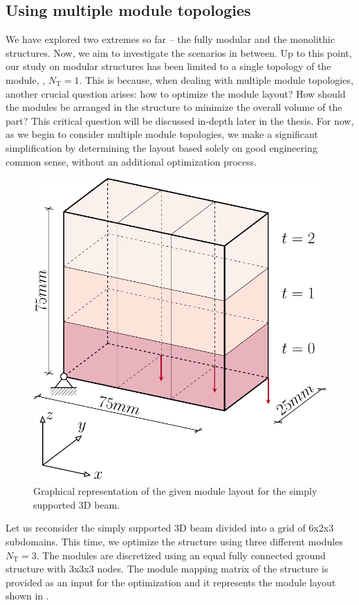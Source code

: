 \subsection{Using multiple module topologies}
We have explored two extremes so far -- the fully modular and the monolithic structures. Now, we aim to investigate the scenarios in between. Up to this point, our study on modular structures has been limited to a single topology of the module, \ie, $N_\text{T}=1$. This is because, when dealing with multiple module topologies, another crucial question arises: how to optimize the module layout? How should the modules be arranged in the structure to minimize the overall volume of the part? This critical question will be discussed in-depth later in the thesis. For now, as we begin to consider multiple module topologies, we make a significant simplification by determining the layout based solely on good engineering common sense, without an additional optimization process.

\begin{figure}
    \centering
    \includegraphics[width=0.6\linewidth]{figures/05_cellular_opt/00_mutiple_bc/supported_3D_symm.pdf}
    \caption{Graphical representation of the given module layout for the simply supported 3D beam.}
    \label{fig:05_mutiple_bc}
\end{figure}

Let us reconsider the simply supported 3D beam divided into a grid of 6x2x3 subdomains. This time, we optimize the structure using three different modules $N_\text{T}=3$. The modules are discretized using an equal fully connected ground structure with 3x3x3 nodes. The module mapping matrix of the structure is provided as an input for the optimization
and it represents the module layout shown in . 

